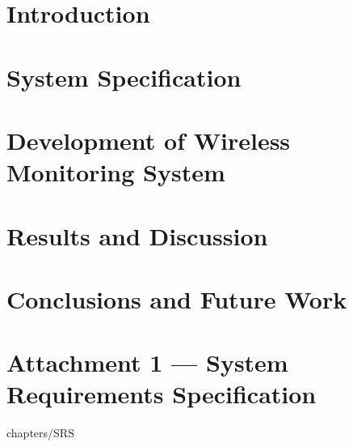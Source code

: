 \documentclass[10pt,a4paper,twoside]{report}
\begin{document}




\begin{Prolog}
\cleardoublepage

\tableofcontents



%

	
\end{Prolog}

\StartBody

\chapter{Introduction}



\chapter{System Specification}


\chapter{Development of Wireless Monitoring System}


\chapter{Results and Discussion}


\chapter{Conclusions and Future Work}







%


%
%
\chapter*{Attachment 1 --- System Requirements Specification}
  {chapters/SRS}
\end{document}
